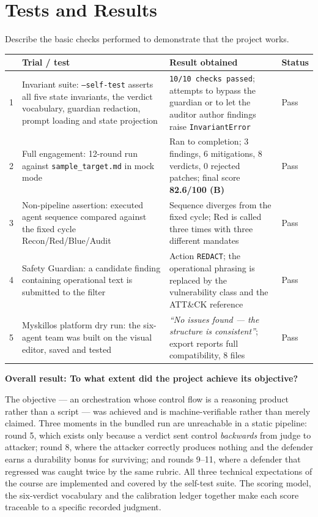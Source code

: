 \documentclass[11pt,a4paper]{article}
\newcommand{\sectionintro}[1]{\textcolor{courseGray}{\small #1}\par\vspace{2pt}}
\newcommand{\qa}[2]{\textbf{#1}\par\vspace{-2pt}\begin{answerbox}#2\end{answerbox}}
\begin{document}
\section{Tests and Results}
\sectionintro{Describe the basic checks performed to demonstrate that the project works.}

\begin{tabularx}{\linewidth}{@{}C{0.7cm}Y Y L{2.0cm}@{}}
\toprule
& \textbf{Trial / test} & \textbf{Result obtained} & \textbf{Status} \\
 & Invariant suite: \texttt{--self-test} asserts all five state invariants, the verdict vocabulary, guardian redaction, prompt loading and state projection & \texttt{10/10 checks passed}; attempts to bypass the guardian or to let the auditor author findings raise \texttt{InvariantError} & Pass \\
2 & Full engagement: 12-round run against \texttt{sample\_target.md} in mock mode & Ran to completion; 3 findings, 6 mitigations, 8 verdicts, 0 rejected patches; final score \textbf{82.6/100 (B)} & Pass \\
3 & Non-pipeline assertion: executed agent sequence compared against the fixed cycle Recon/Red/Blue/Audit & Sequence diverges from the fixed cycle; Red is called three times with three different mandates & Pass \\
4 & Safety Guardian: a candidate finding containing operational text is submitted to the filter & Action \texttt{REDACT}; the operational phrasing is replaced by the vulnerability class and the ATT\&CK reference & Pass \\
5 & Myskillos platform dry run: the six-agent team was built on the visual editor, saved and tested & \emph{``No issues found --- the structure is consistent''}; export reports full compatibility, 8 files & Pass \\
\bottomrule
\end{tabularx}

\qa{Overall result: To what extent did the project achieve its objective?}{%
The objective --- an orchestration whose control flow is a reasoning product rather than a
script --- was achieved and is machine-verifiable rather than merely claimed. Three moments
in the bundled run are unreachable in a static pipeline: round 5, which exists only because
a verdict sent control \emph{backwards} from judge to attacker; round 8, where the attacker
correctly produces nothing and the defender earns a durability bonus for surviving; and
rounds 9--11, where a defender that regressed was caught twice by the same rubric. All
three technical expectations of the course are implemented and covered by the self-test
suite. The scoring model, the six-verdict vocabulary and the calibration ledger together
make each score traceable to a specific recorded judgment.}
\end{document}
